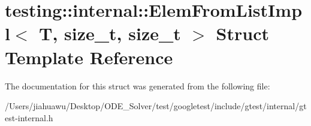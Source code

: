 \hypertarget{structtesting_1_1internal_1_1_elem_from_list_impl}{}\section{testing\+:\+:internal\+:\+:Elem\+From\+List\+Impl$<$ T, size\+\_\+t, size\+\_\+t $>$ Struct Template Reference}
\label{structtesting_1_1internal_1_1_elem_from_list_impl}


The documentation for this struct was generated from the following file\+:\begin{DoxyCompactItemize}
\item 
/\+Users/jiahuawu/\+Desktop/\+O\+D\+E\+\_\+\+Solver/test/googletest/include/gtest/internal/gtest-\/internal.\+h\end{DoxyCompactItemize}

